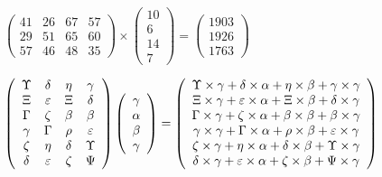 \documentclass[12pt]{article}
\begin{document}
\noindent{}
 
 

 
$\left( \begin{array}{ccccccccccccccc}
 41  & 
 26  & 
 67  & 
 57  \\ 
 29  & 
 51  & 
 65  & 
 60  \\ 
 57  & 
 46  & 
 48  & 
 35
\end{array}\right) \times
\left( \begin{array}{c}
 10  \\ 
 6  \\ 
 14  \\ 
 7
\end{array}\right)  =
\left( \begin{array}{c}
 1903  \\ 
 1926  \\ 
 1763
\end{array}\right)  $
 
$  %
 \left( \begin{array}
 {
 c
 c
 c
 c
 }
 \Upsilon & 
 \delta & 
 \eta & 
 \gamma \\ 
                    \Xi & 
 \varepsilon & 
                    \Xi & 
 \delta \\ 
 \Gamma & 
                    \zeta & 
 \beta & 
 \beta \\ 
 \gamma & 
 \Gamma & 
 \rho & 
 \varepsilon \\ 
                    \zeta & 
 \eta & 
 \delta & 
 \Upsilon \\ 
 \delta & 
 \varepsilon & 
                    \zeta & 
 \Psi
 \end{array} \right)
 \left( \begin{array}
 {
 c
 }
 \gamma \\ 
 \alpha \\ 
 \beta \\ 
 \gamma
 \end{array} \right)
=
  \left( \begin{array}
 {
 c
 }
 \Upsilon \times  \gamma   +  \delta \times  \alpha   +  \eta \times  \beta   +  \gamma \times  \gamma \\ 
                    \Xi \times  \gamma   +  \varepsilon \times  \alpha   +                     \Xi \times  \beta   +  \delta \times  \gamma \\ 
 \Gamma \times  \gamma   +                     \zeta \times  \alpha   +  \beta \times  \beta   +  \beta \times  \gamma \\ 
 \gamma \times  \gamma   +  \Gamma \times  \alpha   +  \rho \times  \beta   +  \varepsilon \times  \gamma \\ 
                    \zeta \times  \gamma   +  \eta \times  \alpha   +  \delta \times  \beta   +  \Upsilon \times  \gamma \\ 
 \delta \times  \gamma   +  \varepsilon \times  \alpha   +                     \zeta \times  \beta   +  \Psi \times  \gamma
 \end{array} \right)
$
 
\end{document}

